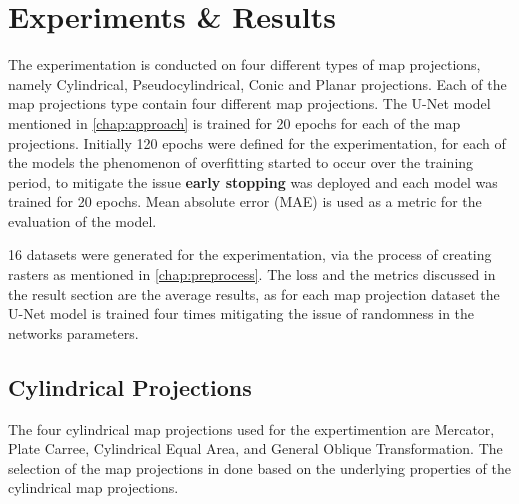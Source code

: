 
\clearpage
\cleardoublepage

\chapter{Experiments \& Results}

The experimentation is conducted on four different types of map projections, namely Cylindrical, Pseudocylindrical, Conic and Planar projections. Each of the map projections type contain four different map projections.
The U-Net model mentioned in \autoref{chap:approach} is trained for 20 epochs for each of the map projections. Initially 120 epochs were defined for the experimentation, for each of the models the phenomenon of overfitting started to occur over the training period, to mitigate the issue \textbf{early stopping} was deployed and each model was trained for 20 epochs.
Mean absolute error (MAE) is used as a metric for the evaluation of the model.

16 datasets were generated for the experimentation, via the process of creating rasters as mentioned in \autoref{chap:preprocess}. The loss and the metrics discussed in the result section are the average results, as for each map projection dataset the U-Net model is trained four times mitigating the issue of randomness in the networks parameters.
\section{Cylindrical Projections}
The four cylindrical map projections used for the expertimention are Mercator, Plate Carree, Cylindrical Equal Area, and General Oblique Transformation. The selection of the map projections in done based on the underlying properties of the cylindrical map projections.

